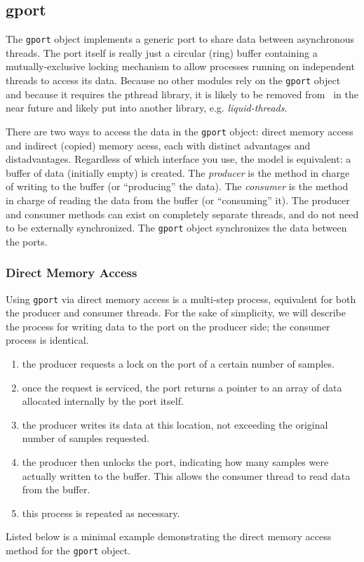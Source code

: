 %
%
\subsection{gport}
\label{module:buffer:gport}
The {\tt gport} object implements a generic port to share data between
asynchronous threads.
The port itself is really just a circular (ring) buffer containing a
mutually-exclusive locking mechanism to allow processes running on independent
threads to access its data.
Because no other modules rely on the {\tt gport} object and because it
requires the pthread library, it is likely to be removed from \liquid\ in the
near future and likely put into another library, e.g. {\em liquid-threads}.

There are two ways to access the data in the {\tt gport} object: direct memory
access and indirect (copied) memory acess, each with distinct advantages and
distadvantages.
Regardless of which interface you use, the model is equivalent:
a buffer of data (initially empty) is created.
The {\it producer} is the method in charge of writing to the buffer (or
``producing'' the data).
The {\it consumer} is the method in charge of reading the data from the buffer
(or ``consuming'' it).
The producer and consumer methods can exist on completely separate threads,
and do not need to be externally synchronized.
The {\tt gport} object synchronizes the data between the ports.

\subsubsection{Direct Memory Access}
Using {\tt gport} via direct memory access is a multi-step process, equivalent
for both the producer and consumer threads.
For the sake of simplicity, we will describe the process for writing data to
the port on the producer side; the consumer process is identical.
%
\begin{enumerate}
\item the producer requests a lock on the port of a certain number of samples.
\item once the request is serviced, the port returns a pointer to an array of
      data allocated internally by the port itself.
\item the producer writes its data at this location, not exceeding the
      original number of samples requested.
\item the producer then unlocks the port, indicating how many samples were
      actually written to the buffer.
      This allows the consumer thread to read data from the buffer.
\item this process is repeated as necessary.
\end{enumerate}
%
Listed below is a minimal example demonstrating the direct memory access
method for the {\tt gport} object.
%

%

